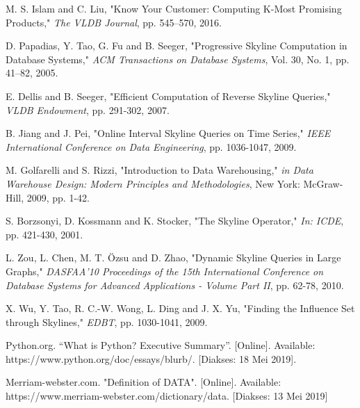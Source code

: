 \begin{thebibliography}{9}
	M. S. Islam and C. Liu, "Know Your Customer: Computing K-Most Promising Products," \textit{The VLDB Journal}, pp. 545–570, 2016.
	
	D. Papadias, Y. Tao, G. Fu and B. Seeger, "Progressive Skyline Computation in Database Systems," \textit{ACM Transactions on Database Systems}, Vol. 30, No. 1, pp. 41–82, 2005.
	
	E. Dellis and B. Seeger, "Efficient Computation of Reverse Skyline Queries," \textit{VLDB Endowment}, pp. 291-302, 2007.
	
	B. Jiang and J. Pei, "Online Interval Skyline Queries on Time Series," \textit{IEEE International Conference on Data Engineering}, pp. 1036-1047, 2009.
	
	M. Golfarelli and S. Rizzi, "Introduction to Data Warehousing," \textit{in Data Warehouse Design: Modern Principles and Methodologies}, New York: McGraw-Hill, 2009, pp. 1-42. 
	
	S. Borzsonyi, D. Kossmann and K. Stocker, "The Skyline Operator," \textit{In: ICDE}, pp. 421-430, 2001.
	
	L. Zou, L. Chen, M. T. Özsu and D. Zhao, "Dynamic Skyline Queries in Large Graphs," \textit{DASFAA'10 Proceedings of the 15th International Conference on Database Systems for Advanced Applications - Volume Part II}, pp. 62-78, 2010.
	
	X. Wu, Y. Tao, R. C.-W. Wong, L. Ding and J. X. Yu, "Finding the Influence Set through Skylines," \textit{EDBT}, pp. 1030-1041, 2009.
	
	Python.org. “What is Python? Executive Summary”. [Online]. Available: https://www.python.org/doc/essays/blurb/. [Diakses: 18 Mei 2019].
	
	Merriam-webster.com. "Definition of DATA". [Online]. Available: https://www.merriam-webster.com/dictionary/data. [Diakses: 13 Mei 2019]
		
\end{thebibliography}
